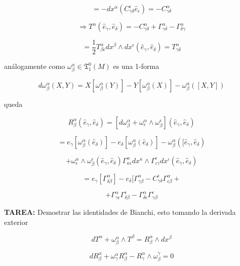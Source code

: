 \documentclass{report}
\begin{document}
{\[= -dx^{\alpha} (C_{\gamma \delta}^{\epsilon}\hat{e}_{\epsilon}) = -C_{\gamma \delta}^{\alpha}\]

\[\Rightarrow T^{ \alpha} ( \hat{e}_{ \gamma}, \hat{e}_{ \delta})=-C_{ \gamma \delta}^{ \alpha}+ \Gamma_{ \gamma \delta }^{\alpha} - \Gamma_{\delta \gamma }^{\alpha }\]

\[= \frac{1}{2} T_{\beta \epsilon}^{\alpha} d x^{\beta} \wedge dx^{\epsilon} (\hat{e}_{\gamma} ,\hat{e}_{\delta}) = T_{\gamma\delta}^{\alpha}\]

análogamente como $\omega_{\beta}^{\alpha} \in \mathfrak{T}_{1}^{0}(M)$ es una 1-forma

\[d \omega _{\beta}^{\alpha} (X,Y) = X[\omega_{\beta}^{\alpha}(Y)] -Y [\omega_{\beta}^{\alpha} (X)] - \omega_{\beta}^{\alpha} ([X,Y])\]

queda

\[R_{\beta}^{\alpha}(\hat{e}_{\gamma},\hat{e}_{\delta}) =[d \omega _{\beta}^{\alpha} + \omega _{\epsilon} ^{\alpha} \wedge \omega_{\beta}^{\epsilon}] (\hat{e}_{\gamma}, \hat{e}_{\delta})\]

\[= e_{\gamma} [\omega_{\beta}^{\alpha} (\hat{e}_{\delta})] - e_{\delta} [\omega_{\beta}^{\alpha} (\hat{e}_{\delta})] - \omega_{\beta}^{\alpha} ([\hat{e}_{\gamma},\hat{e}_{\delta})\]

\[+ \omega _{\epsilon}^{\alpha} \wedge \omega _{\beta}^{\epsilon} (\hat{e}_{\gamma},\hat{e}_{\delta}) \Gamma_{\kappa \epsilon}^{\alpha} dx^{\kappa} \wedge \Gamma_{\iota \gamma} ^{\epsilon} dx^{\iota}(\hat{e}_{\gamma} , \hat{e}_{\delta})\]

\[= e_{\gamma}[ \Gamma_{\delta \beta}^{\alpha}]-e_{\delta} [\Gamma_{\gamma \beta}^{\alpha} -C_{\gamma \delta}^{\epsilon} \Gamma_{\epsilon \beta}^{\alpha} +\]

\[+ \Gamma_{\gamma \epsilon} ^{\alpha}\Gamma_{\delta \beta}^{\epsilon} - \Gamma_{\delta \epsilon}^{\alpha} \Gamma_{\gamma \beta} ^{\epsilon}\]

\textbf{TAREA:} Demostrar las identidades de Bianchi, esto tomando la derivada exterior

\begin{equation}
dT^{\alpha} + \omega _{\beta} ^{\alpha} \wedge T^{\beta} =R_{\beta}^{\alpha} \wedge dx^{\beta}
\end{equation}

\begin{equation}
dR_{\beta}^{\alpha} + \omega _{\gamma} ^{\alpha} R_{\beta}^{\alpha} - R_{\gamma}^{\alpha} \wedge \omega _{\beta}^{\gamma} = 0
\end{equation}

}
\end{document}
